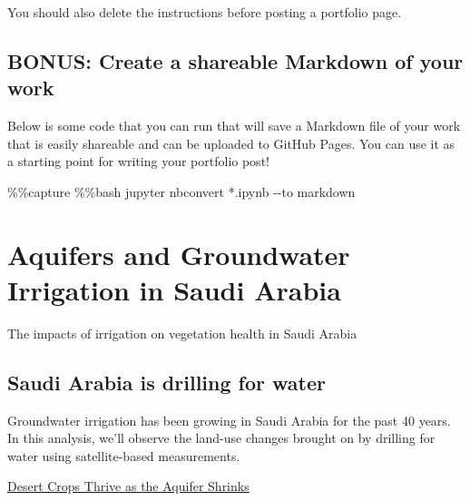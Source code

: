 \documentclass[
  letterpaper,
  DIV=11,
  numbers=noendperiod,
  oneside]{scrreprt}
\newenvironment{Shaded}{\begin{snugshade}}{\end{snugshade}}
\newcommand{\NormalTok}[1]{\textcolor[rgb]{0.00,0.23,0.31}{#1}}
\newcommand{\OperatorTok}[1]{\textcolor[rgb]{0.37,0.37,0.37}{#1}}
\begin{document}
You should also delete the instructions before posting a portfolio page.

\section{BONUS: Create a shareable Markdown of your
work}\label{bonus-create-a-shareable-markdown-of-your-work}

Below is some code that you can run that will save a Markdown file of
your work that is easily shareable and can be uploaded to GitHub Pages.
You can use it as a starting point for writing your portfolio post!

\begin{Shaded}
\begin{Highlighting}[]
\OperatorTok{\%\%}\NormalTok{capture}
\OperatorTok{\%\%}\NormalTok{bash}
\NormalTok{jupyter nbconvert }\OperatorTok{*}\NormalTok{.ipynb }\OperatorTok{{-}{-}}\NormalTok{to markdown}
\end{Highlighting}
\end{Shaded}


\chapter{Aquifers and Groundwater Irrigation in Saudi
Arabia}\label{aquifers-and-groundwater-irrigation-in-saudi-arabia}

The impacts of irrigation on vegetation health in Saudi Arabia

\hfill\break

\section{Saudi Arabia is drilling for
water}\label{saudi-arabia-is-drilling-for-water}

Groundwater irrigation has been growing in Saudi Arabia for the past 40
years. In this analysis, we'll observe the land-use changes brought on
by drilling for water using satellite-based measurements.

\begin{tcolorbox}[enhanced jigsaw, colbacktitle=quarto-callout-color!10!white, opacityback=0, bottomtitle=1mm, toptitle=1mm, bottomrule=.15mm, left=2mm, colframe=quarto-callout-color-frame, leftrule=.75mm, opacitybacktitle=0.6, colback=white, rightrule=.15mm, toprule=.15mm, breakable, titlerule=0mm, title=\textcolor{quarto-callout-color}{\faInfo}\hspace{0.5em}{Read More}, coltitle=black, arc=.35mm]

\href{https://earthobservatory.nasa.gov/images/145975/desert-crops-thrive-as-the-aquifer-shrinks}{Desert
Crops Thrive as the Aquifer Shrinks}

\end{tcolorbox}
\end{document}
